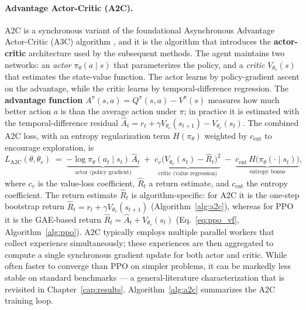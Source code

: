 \paragraph{Advantage Actor-Critic (A2C).}
A2C is a synchronous variant of the foundational Asynchronous Advantage Actor-Critic (A3C) algorithm \cite{Mnih2016}, and it is the algorithm that introduces the \textbf{actor-critic} architecture used by the subsequent methods. The agent maintains two networks: an \emph{actor} $\pi_\theta(a \mid s)$ that parameterizes the policy, and a \emph{critic} $V_{\theta_v}(s)$ that estimates the state-value function. The actor learns by policy-gradient ascent on the advantage, while the critic learns by temporal-difference regression. The \textbf{advantage function} $A^\pi(s, a) = Q^\pi(s, a) - V^\pi(s)$ measures how much better action $a$ is than the average action under $\pi$; in practice it is estimated with the temporal-difference residual $\hat{A}_t = r_t + \gamma V_{\theta_v}(s_{t+1}) - V_{\theta_v}(s_t)$. The combined A2C loss, with an entropy regularization term $H(\pi_\theta)$ weighted by $c_{\mathrm{ent}}$ to encourage exploration, is
\begin{equation}\label{eq:a2c_loss}
L_{\text{A2C}}(\theta, \theta_v) \;=\; \underbrace{-\log \pi_\theta(a_t \mid s_t)\,\hat{A}_t}_{\text{actor (policy gradient)}} \;+\; \underbrace{c_v\big(V_{\theta_v}(s_t) - \hat{R}_t\big)^2}_{\text{critic (value regression)}} \;-\; \underbrace{c_{\mathrm{ent}}\, H\big(\pi_\theta(\cdot \mid s_t)\big)}_{\text{entropy bonus}},
\end{equation}
where $c_v$ is the value-loss coefficient, $\hat{R}_t$ a return estimate, and $c_{\mathrm{ent}}$ the entropy coefficient. The return estimate $\hat{R}_t$ is algorithm-specific: for A2C it is the one-step bootstrap return $\hat{R}_t = r_t + \gamma V_{\theta_v}(s_{t+1})$ (Algorithm~\ref{alg:a2c}), whereas for PPO it is the GAE-based return $\hat{R}_t = \hat{A}_t + V_{\theta_v}(s_t)$ (Eq.~\eqref{eq:ppo_vf}, Algorithm~\ref{alg:ppo}). A2C typically employs multiple parallel workers that collect experience simultaneously; these experiences are then aggregated to compute a single synchronous gradient update for both actor and critic. While often faster to converge than PPO on simpler problems, it can be markedly less stable on standard benchmarks --- a general-literature characterization that is revisited in Chapter~\ref{cap:results}. Algorithm~\ref{alg:a2c} summarizes the A2C training loop.


